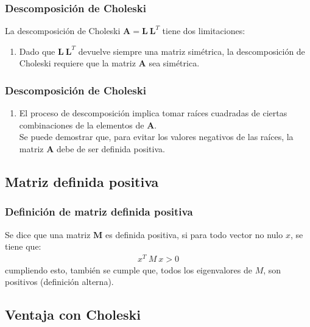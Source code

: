 \documentclass[12pt]{beamer}
\begin{document}
\begin{frame}
\frametitle{Descomposición de Choleski}
La descomposición de Choleski $\mathbf{A = L \: L}^{T}$ tiene dos limitaciones:
\begin{enumerate}
\item Dado que $\mathbf{L \: L}^{T}$ devuelve siempre una matriz simétrica, la descomposición de Choleski requiere que la matriz $\mathbf{A}$ sea simétrica.
\seti
\end{enumerate}
\end{frame}
\begin{frame}
\frametitle{Descomposición de Choleski}
\begin{enumerate}
\conti
\item El proceso de descomposición implica tomar raíces cuadradas de ciertas combinaciones de la elementos de $\mathbf{A}$.
\\
\bigskip
\pause
Se puede demostrar que, para evitar los valores negativos de las raíces, la matriz $\mathbf{A}$ debe de ser definida positiva.
\end{enumerate}
\end{frame}

\subsection*{Matriz definida positiva}

\begin{frame}
\frametitle{Definición de matriz definida positiva}
Se dice que una matriz $\mathbf{M}$ es definida positiva, si para todo vector no nulo $x$, se tiene que:
\pause
\begin{align*}
x^{T} \: M \: x > 0
\end{align*}
cumpliendo esto, también se cumple que, todos los eigenvalores de $M$, son positivos (definición alterna).
\end{frame}

\subsection*{Ventaja con Choleski}
\end{document}
